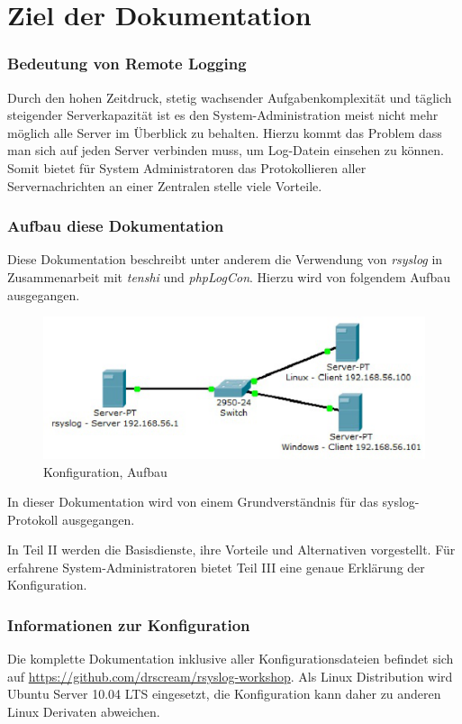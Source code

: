 \part{Ziel der Dokumentation}
\label{Ziel der Dokumentation}
\section{Bedeutung von Remote Logging}
Durch den hohen Zeitdruck, stetig wachsender Aufgabenkomplexität und täglich steigender Serverkapazität ist es den System-Administration meist nicht mehr möglich alle Server im Überblick zu behalten. Hierzu kommt das Problem dass man sich auf jeden Server verbinden muss, um Log-Datein einsehen zu können. Somit bietet für System Administratoren das Protokollieren aller Servernachrichten an einer Zentralen stelle viele Vorteile.

\section{Aufbau diese Dokumentation}
Diese Dokumentation beschreibt unter anderem die Verwendung von \textit{rsyslog} in Zusammenarbeit mit \textit{tenshi} und \textit{phpLogCon}. Hierzu wird von folgendem Aufbau ausgegangen.

\begin{figure}[h]
\begin{center}
 \includegraphics[width=\textwidth]{content/images/Server-Aufbau.eps}
  \caption{Konfiguration, Aufbau}
\end{center}
\end{figure}

In dieser Dokumentation wird von einem Grundverständnis für das syslog-Protokoll ausgegangen.

In Teil II werden die Basisdienste, ihre Vorteile und Alternativen vorgestellt. Für erfahrene System-Administratoren bietet Teil III eine genaue Erklärung der Konfiguration.

\section{Informationen zur Konfiguration}
Die komplette Dokumentation inklusive aller Konfigurationsdateien befindet sich auf \url{https://github.com/drscream/rsyslog-workshop}. Als Linux Distribution wird Ubuntu Server 10.04 LTS eingesetzt, die Konfiguration kann daher zu anderen Linux Derivaten abweichen.
